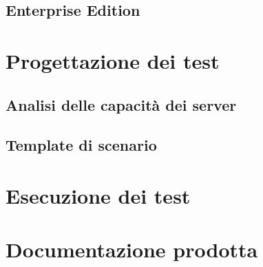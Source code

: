 \subsection{Enterprise Edition}
\section{Progettazione dei test}
\subsection{Analisi delle capacità dei server}
\subsection{Template di scenario}
\section{Esecuzione dei test}
\section{Documentazione prodotta}